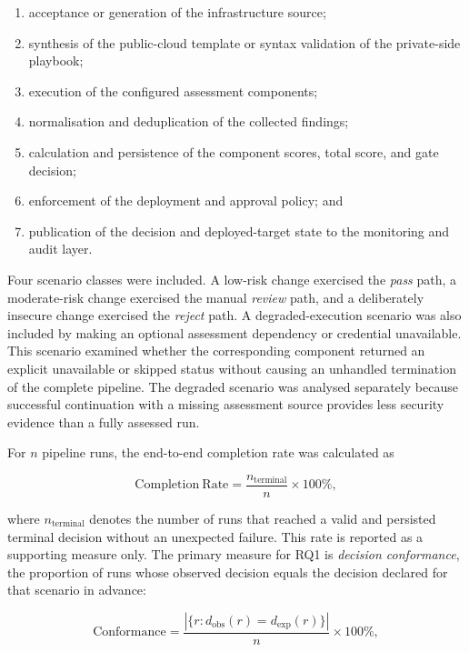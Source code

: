 \begin{enumerate}
    \item acceptance or generation of the infrastructure source;
    \item synthesis of the public-cloud template or syntax validation of the
    private-side playbook;
    \item execution of the configured assessment components;
    \item normalisation and deduplication of the collected findings;
    \item calculation and persistence of the component scores, total score, and gate
    decision;
    \item enforcement of the deployment and approval policy; and
    \item publication of the decision and deployed-target state to the monitoring and
    audit layer.
\end{enumerate}

Four scenario classes were included. A low-risk change exercised the \emph{pass} path,
a moderate-risk change exercised the manual \emph{review} path, and a deliberately
insecure change exercised the \emph{reject} path. A degraded-execution scenario was also
included by making an optional assessment dependency or credential unavailable. This
scenario examined whether the corresponding component returned an explicit unavailable
or skipped status without causing an unhandled termination of the complete pipeline.
The degraded scenario was analysed separately because successful continuation with a
missing assessment source provides less security evidence than a fully assessed run.

For $n$ pipeline runs, the end-to-end completion rate was calculated as

\begin{equation}
\label{eq:pipeline-completion-rate}
\mathrm{Completion\ Rate} =
\frac{n_{\mathrm{terminal}}}{n} \times 100\%,
\end{equation}

where $n_{\mathrm{terminal}}$ denotes the number of runs that reached a valid and
persisted terminal decision without an unexpected failure. This rate is reported
as a supporting measure only. The primary measure for RQ1 is \emph{decision
conformance}, the proportion of runs whose observed decision equals the decision
declared for that scenario in advance:

\begin{equation}
\label{eq:decision-conformance}
\mathrm{Conformance} =
\frac{|\{r : d_{\mathrm{obs}}(r) = d_{\mathrm{exp}}(r)\}|}{n} \times 100\%,
\end{equation}

